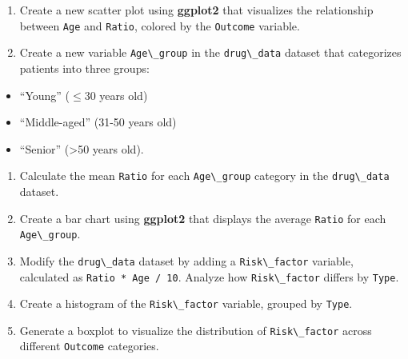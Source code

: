 \documentclass[
]{book}
\newcommand{\passthrough}[1]{#1}
\providecommand{\tightlist}{%
  \setlength{\itemsep}{0pt}\setlength{\parskip}{0pt}}
\theoremstyle{definition}
\theoremstyle{definition}
\theoremstyle{definition}
\theoremstyle{definition}
\theoremstyle{remark}
\begin{document}
\begin{enumerate}
\def\labelenumi{\arabic{enumi}.}
\setcounter{enumi}{18}
\tightlist
\item
  Create a new scatter plot using \textbf{ggplot2} that visualizes the relationship between \passthrough{\lstinline!Age!} and \passthrough{\lstinline!Ratio!}, colored by the \passthrough{\lstinline!Outcome!} variable.
\item
  Create a new variable \passthrough{\lstinline!Age\_group!} in the \passthrough{\lstinline!drug\_data!} dataset that categorizes patients into three groups:\\
\end{enumerate}

\begin{itemize}
\tightlist
\item
  ``Young'' (\(\leq 30\) years old)
\item
  ``Middle-aged'' (31-50 years old)
\item
  ``Senior'' (\textgreater50 years old).
\end{itemize}

\begin{enumerate}
\def\labelenumi{\arabic{enumi}.}
\setcounter{enumi}{20}
\tightlist
\item
  Calculate the mean \passthrough{\lstinline!Ratio!} for each \passthrough{\lstinline!Age\_group!} category in the \passthrough{\lstinline!drug\_data!} dataset.\\
\item
  Create a bar chart using \textbf{ggplot2} that displays the average \passthrough{\lstinline!Ratio!} for each \passthrough{\lstinline!Age\_group!}.\\
\item
  Modify the \passthrough{\lstinline!drug\_data!} dataset by adding a \passthrough{\lstinline!Risk\_factor!} variable, calculated as \passthrough{\lstinline!Ratio * Age / 10!}. Analyze how \passthrough{\lstinline!Risk\_factor!} differs by \passthrough{\lstinline!Type!}.\\
\item
  Create a histogram of the \passthrough{\lstinline!Risk\_factor!} variable, grouped by \passthrough{\lstinline!Type!}.\\
\item
  Generate a boxplot to visualize the distribution of \passthrough{\lstinline!Risk\_factor!} across different \passthrough{\lstinline!Outcome!} categories.
\end{enumerate}
\end{document}
